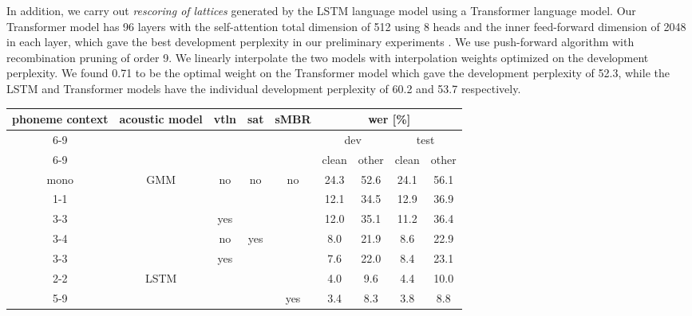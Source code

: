 \documentclass[a4paper]{article}
\begin{document}
In addition, we carry out \textit{rescoring of lattices} generated by the LSTM language model using a Transformer \cite{transfo} language model.
Our Transformer model has 96 layers with the self-attention total dimension of 512 using 8 heads and the inner feed-forward dimension of 2048 in each layer, which gave the best development perplexity in our preliminary experiments \cite{irie:is19}.
We use push-forward algorithm \cite{sundermeyer2014:rescoring} with recombination pruning of
order 9.
We linearly interpolate the two models with interpolation weights optimized on the development perplexity.
We found 0.71 to be the optimal weight on the Transformer model which gave the development perplexity of 52.3,
while the LSTM and Transformer models have the individual development perplexity of 60.2 and 53.7 respectively.
\begin{table*}[!t]
\centering
\caption{\ac{gmmhmm} and hybrid \ac{dnn}/\ac{hmm} results on LibriSpeech with 12k \ac{cart} labels and evaluated with the official 4-gram \ac{lm}.}
\label{tab:evol}
\begin{tabular}{|c|c|c|c|c|c|c|c|c|}
\hline
\multirow{3}{*}{phoneme context} & \multirow{3}{*}{acoustic model} & \multirow{3}{*}{\ac{vtln}} & \multirow{3}{*}{\ac{sat}} & \multirow{3}{*}{sMBR} & \multicolumn{4}{c|}{\acs*{wer} {[}\%{]}} \\ \cline{6-9}
&&&&                                                                                      & \multicolumn{2}{c|}{dev}           & \multicolumn{2}{c|}{test} \\ \cline{6-9}
&&&&                                                                                      & clean & \multicolumn{1}{c|}{other} & clean & \multicolumn{1}{c|}{other} \\ \hline \hline
mono&\multirow{5}{*}{GMM}&\multirow{2}{*}{no} & \multirow{3}{*}{no} & \multirow{6}{*}{no} & 24.3 & 52.6  & 24.1 & 56.1 \\ \cline{1-1}\cline{6-9}
\multirow{6}{*}{tri}    &&                    &                     &                     & 12.1 & 34.5  & 12.9 & 36.9 \\ \cline{3-3}\cline{6-9}
&                        & yes                &                     &                     & 12.0 & 35.1  & 11.2 & 36.4  \\ \cline{3-4}\cline{6-9}
&                        & no                 & \multirow{4}{*}{yes}&                     &  8.0 & 21.9  &  8.6 & 22.9  \\ \cline{3-3}\cline{6-9}
&                        &\multirow{3}{*}{yes}&                     &                     &  7.6 & 22.0  &  8.4 & 23.1  \\ \cline{2-2}\cline{6-9}
&  \multirow{2}{*}{LSTM} &                    &                     &                     &  4.0 &  9.6  &  4.4 & 10.0  \\ \cline{5-9}
&                        &                    &                     & yes                 &  3.4 &  8.3  &  3.8 &  8.8  \\ \hline
\end{tabular}
\end{table*}
\end{document}
